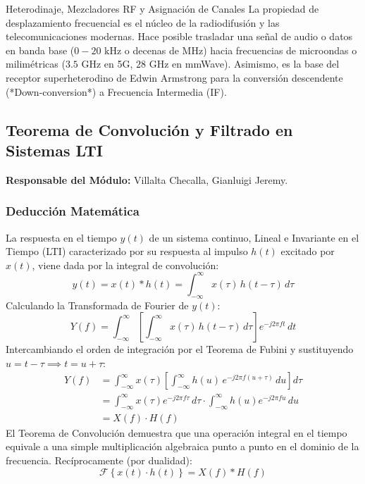 \documentclass[11pt,a4paper]{article}
\begin{document}
\begin{telecomAppBox}{Heterodinaje, Mezcladores RF y Asignaci\'on de Canales}
La propiedad de desplazamiento frecuencial es el n\'ucleo de la radiodifusi\'on y las telecomunicaciones modernas. Hace posible trasladar una se\~nal de audio o datos en banda base ($0 - 20\text{ kHz}$ o decenas de MHz) hacia frecuencias de microondas o milim\'etricas ($3.5\text{ GHz}$ en 5G, $28\text{ GHz}$ en mmWave). Asimismo, es la base del receptor superheterodino de Edwin Armstrong para la conversi\'on descendente (*Down-conversion*) a Frecuencia Intermedia (IF).
\end{telecomAppBox}

\subsection{Teorema de Convoluci\'on y Filtrado en Sistemas LTI}
\textbf{Responsable del M\'odulo:} Villalta Checalla, Gianluigi Jeremy.

\subsubsection{Deducci\'on Matem\'atica}
La respuesta en el tiempo $y(t)$ de un sistema continuo, Lineal e Invariante en el Tiempo (LTI) caracterizado por su respuesta al impulso $h(t)$ excitado por $x(t)$, viene dada por la integral de convoluci\'on:
\begin{equation}
  y(t) = x(t) * h(t) = \int_{-\infty}^{\infty} x(\tau) \, h(t - \tau) \, d\tau
\end{equation}
Calculando la Transformada de Fourier de $y(t)$:
\begin{equation}
  Y(f) = \int_{-\infty}^{\infty} \left[ \int_{-\infty}^{\infty} x(\tau) \, h(t - \tau) \, d\tau \right] e^{-j 2\pi f t} \, dt
\end{equation}
Intercambiando el orden de integraci\'on por el Teorema de Fubini y sustituyendo $u = t - \tau \implies t = u + \tau$:
\begin{align}
  Y(f) &= \int_{-\infty}^{\infty} x(\tau) \left[ \int_{-\infty}^{\infty} h(u) \, e^{-j 2\pi f (u + \tau)} \, du \right] d\tau \nonumber \\
  &= \int_{-\infty}^{\infty} x(\tau) e^{-j 2\pi f \tau} \, d\tau \cdot \int_{-\infty}^{\infty} h(u) e^{-j 2\pi f u} \, du \nonumber \\
  &= X(f) \cdot H(f)
  \label{eq:convolution_thm}
\end{align}
El Teorema de Convoluci\'on demuestra que una operaci\'on integral en el tiempo equivale a una simple multiplicaci\'on algebraica punto a punto en el dominio de la frecuencia. Rec\'iprocamente (por dualidad):
\begin{equation}
  \mathcal{F}\left\{ x(t) \cdot h(t) \right\} = X(f) * H(f)
\end{equation}
\end{document}
